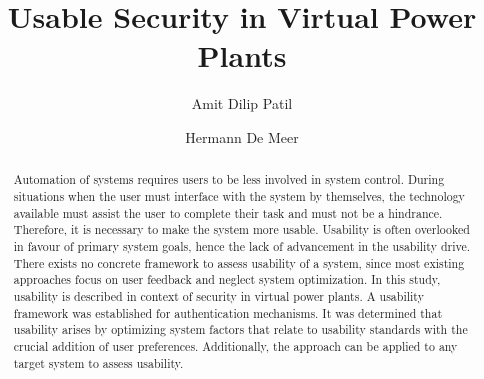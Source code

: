 \documentclass[sigconf]{acmart}
\begin{document}
\title{Usable Security in Virtual Power Plants}


\author{Amit Dilip Patil}

\author{Hermann De Meer}



\renewcommand{\shortauthors}{Patil et al.}


\begin{abstract}
Automation of systems requires users to be less involved in system control. During situations when the user must interface with the system by themselves, the technology available must assist the user to complete their task and must not be a hindrance. Therefore, it is necessary to make the system more usable. Usability is often overlooked in favour of primary system goals, hence the lack of advancement in the usability drive. There exists no concrete framework to assess usability of a system, since most existing approaches focus on user feedback and neglect system optimization. In this study, usability is described in context of security in virtual power plants. A usability framework was established for authentication mechanisms. It was determined that usability arises by optimizing system factors that relate to usability standards with the crucial addition of user preferences. Additionally, the approach can be applied to any target system to assess usability.
\end{abstract}
\end{document}
